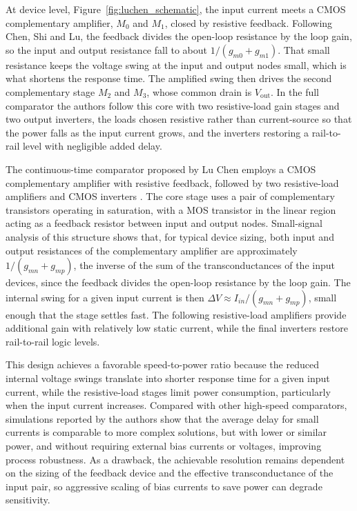 At device level, Figure~\ref{fig:luchen_schematic}, the input current meets a CMOS complementary amplifier, $M_0$ and $M_1$, closed by resistive feedback. Following Chen, Shi and Lu, the feedback divides the open-loop resistance by the loop gain, so the input and output resistance fall to about $1/(g_{m0}+g_{m1})$. That small resistance keeps the voltage swing at the input and output nodes small, which is what shortens the response time. The amplified swing then drives the second complementary stage $M_2$ and $M_3$, whose common drain is $V_\mathrm{out}$. In the full comparator the authors follow this core with two resistive-load gain stages and two output inverters, the loads chosen resistive rather than current-source so that the power falls as the input current grows, and the inverters restoring a rail-to-rail level with negligible added delay.

The continuous-time comparator proposed by Lu Chen employs a CMOS complementary amplifier with resistive feedback, followed by two resistive-load amplifiers and CMOS inverters \cite{chen_2001}. The core stage uses a pair of complementary transistors operating in saturation, with a MOS transistor in the linear region acting as a feedback resistor between input and output nodes. Small-signal analysis of this structure shows that, for typical device sizing, both input and output resistances of the complementary amplifier are approximately $1/(g_{mn} + g_{mp})$, the inverse of the sum of the transconductances of the input devices, since the feedback divides the open-loop resistance by the loop gain. The internal swing for a given input current is then $\Delta V \approx I_{in}/(g_{mn} + g_{mp})$, small enough that the stage settles fast. The following resistive-load amplifiers provide additional gain with relatively low static current, while the final inverters restore rail-to-rail logic levels.

This design achieves a favorable speed-to-power ratio because the reduced internal voltage swings translate into shorter response time for a given input current, while the resistive-load stages limit power consumption, particularly when the input current increases. Compared with other high-speed comparators, simulations reported by the authors show that the average delay for small currents is comparable to more complex solutions, but with lower or similar power, and without requiring external bias currents or voltages, improving process robustness. As a drawback, the achievable resolution remains dependent on the sizing of the feedback device and the effective transconductance of the input pair, so aggressive scaling of bias currents to save power can degrade sensitivity.

